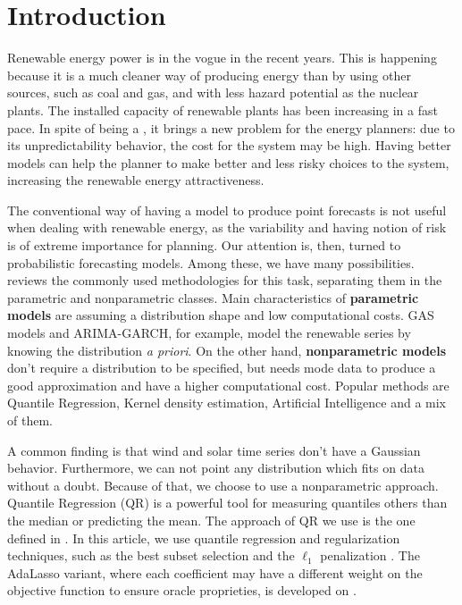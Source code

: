 \section{Introduction}


Renewable energy power is in the vogue in the recent years. This is happening because it is a much cleaner way of producing energy than by using other sources, such as coal and gas, and with less hazard potential as the nuclear plants. The installed capacity of renewable plants has been increasing in a fast pace. 
In spite of being a   , it brings a new problem for the energy planners: due to its unpredictability behavior, the cost for the system may be high. 
Having better models can help the planner to make better and less risky choices to the system, increasing the renewable energy attractiveness. 



The conventional way of having a model to produce point forecasts is not useful when dealing with renewable energy, as the variability and having notion of risk is of extreme importance for planning. Our attention is, then, turned to probabilistic forecasting models. Among these, we have many possibilities. \cite{zhang_review_2014} reviews the commonly used methodologies for this task, separating them in the parametric and nonparametric classes. Main characteristics of \textbf{parametric models} are assuming a distribution shape and low computational costs. GAS models  and ARIMA-GARCH, for example, model the renewable series by knowing the distribution \textit{a priori}. On the other hand, \textbf{nonparametric models} don't require a distribution to be specified, but needs mode data to produce a good approximation and have a higher computational cost. Popular methods are Quantile Regression, Kernel density estimation,  Artificial Intelligence and a mix of them.



A common finding is that wind and solar time series don't have a Gaussian behavior. Furthermore, we can not point any distribution which fits on data without a doubt. Because of that, we choose to use a nonparametric approach.
Quantile Regression (QR) is a powerful tool for measuring quantiles others than the median or predicting the mean. The approach of QR we use is the one defined in \cite{koenker2005quantile}. In this article, we use quantile regression and regularization techniques, such as the best subset selection \cite{bertsimas_best_2015} and the $\ell_1$ penalization \cite{belloni_l1-penalized_2009}. The AdaLasso variant, where each coefficient may have a different weight on the objective function to ensure oracle proprieties, is developed on \cite{ciuperca_adaptive_2016}.






